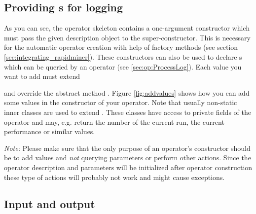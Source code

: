 \subsection{Providing s for logging}

As you can see, the operator skeleton contains a one-argument
constructor which must pass the given description object to the
super-constructor. This is necessary for the automatic operator
creation with help of factory methods (see section
\ref{sec:integrating_rapidminer}). These constructors can also be used to declare
s which can be queried by an  operator
(see \ref{sec:op:ProcessLog}). Each value you want to add must extend 
\begin{center}
\end{center}
and override the abstract method .
Figure \ref{fig:addvalues} shows how you can add some values in the constructor of
your operator. Note that usually non-static inner classes are used to
extend . These classes have access to private fields of
the operator and may, e.g. return the number of the current run, the
current performance or similar values.


\emph{Note:} Please make sure that the only purpose of an operator's
constructor should be to add values and \emph{not} querying parameters or
perform other actions. Since the operator description and parameters will be
initialized after operator construction these type of actions will probably
not work and might cause exceptions.




\subsection{Input and output}
\label{sec:op:inandout}

